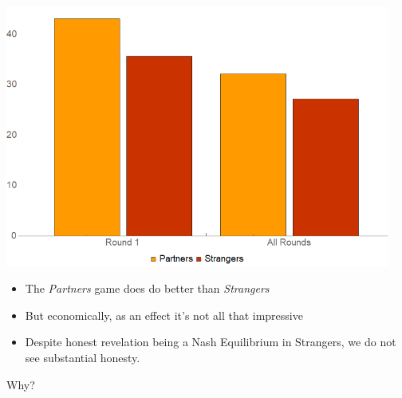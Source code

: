 \documentclass{beamer}
\begin{document}
\begin{frame}
\begin{card}
    \begin{center}
    \includegraphics[width=0.95\textwidth]{./i/EffMain.png}
    \end{center}
\end{card}
\end{frame}

\begin{frame}
\begin{card}[Summary]
   \begin{itemize}
    \item The \emph{Partners} game does do better than \emph{Strangers}
    \item But economically, as an effect it's not all that impressive
    \item Despite honest revelation being a Nash Equilibrium in Strangers, we do not see substantial honesty.
  \end{itemize}
\end{card}

\begin{card}
 \begin{center}
     Why?
 \end{center}
\end{card}
\end{frame}
\end{document}
